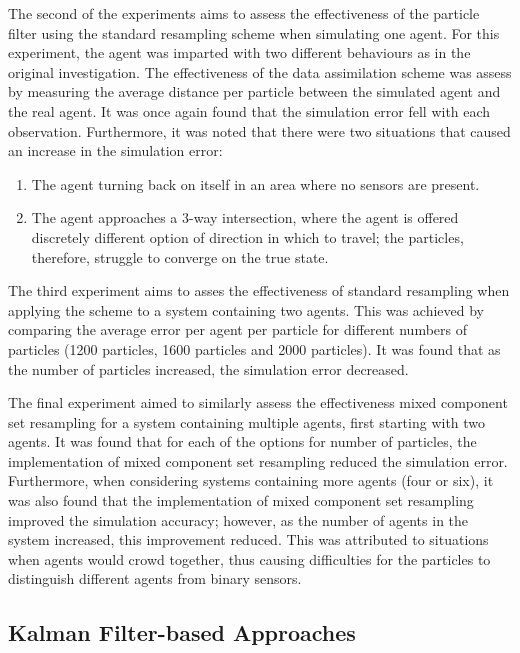 The second of the experiments aims to assess the effectiveness of the particle
filter using the standard resampling scheme when simulating one agent.
For this experiment, the agent was imparted with two different behaviours as in
the original investigation.
The effectiveness of the data assimilation scheme was assess by measuring the
average distance per particle between the simulated agent and the real agent.
It was once again found that the simulation error fell with each observation.
Furthermore, it was noted that there were two situations that caused an increase
in the simulation error:
\begin{enumerate}
    \item The agent turning back on itself in an area where no sensors are
        present.
    \item The agent approaches a 3-way intersection, where the agent is offered
        discretely different option of direction in which to travel; the
        particles, therefore, struggle to converge on the true state.
\end{enumerate}

The third experiment aims to asses the effectiveness of standard resampling when
applying the scheme to a system containing two agents.
This was achieved by comparing the average error per agent per particle for
different numbers of particles (1200 particles, 1600 particles and 2000
particles).
It was found that as the number of particles increased, the simulation error
decreased.

The final experiment aimed to similarly assess the effectiveness mixed component set
resampling for a system containing multiple agents, first starting with two
agents.
It was found that for each of the options for number of particles, the
implementation of mixed component set resampling reduced the simulation error.
Furthermore, when considering systems containing more agents (four or six), it
was also found that the implementation of mixed component set resampling
improved the simulation accuracy; however, as the number of agents in the system
increased, this improvement reduced.
This was attributed to situations when agents would crowd together, thus causing
difficulties for the particles to distinguish different agents from binary
sensors.

\subsection{Kalman Filter-based Approaches}\label{sub:lit_rev:da_abm:kf}

